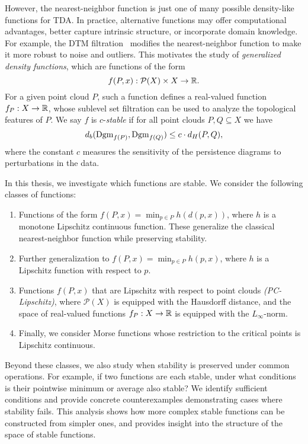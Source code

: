 However, the nearest-neighbor function is just one of many possible density-like
functions for TDA. In practice, alternative functions may offer computational
advantages, better capture intrinsic structure, or incorporate domain knowledge.
For example, the DTM filtration~\cite{anai2020dtm} modifies the nearest-neighbor
function to make it more robust to noise and outliers. This motivates the study
of \emph{generalized density functions}, which are functions of the form
\begin{equation}
    f(P, x) : \mathcal{P}(X) \times X \to \mathbb{R}.
\end{equation}
For a given point cloud $P$, such a function defines a real-valued function
$f_P: X \to \mathbb{R}$, whose sublevel set filtration can be used to analyze the
topological features of $P$. We say $f$ is $c$-\emph{stable} if for all point
clouds $P, Q \subseteq X$ we have
\begin{equation}
    d_b(\operatorname{Dgm}_{f(P)}, \operatorname{Dgm}_{f(Q)}) \leq c \cdot d_H(P, Q),
\end{equation}
where the constant $c$ measures the sensitivity of the persistence diagrams to
perturbations in the data.

In this thesis, we investigate which functions are stable. We consider the
following classes of functions:
\begin{enumerate}
    \item Functions of the form $f(P, x) = \min_{p \in P} h(d(p, x))$, where $h$
          is a monotone Lipschitz continuous function. These generalize the
          classical nearest-neighbor function while preserving stability.
    \item Further generalization to $f(P, x) = \min_{p \in P} h(p, x)$, where
          $h$ is a Lipschitz function with respect to $p$.
    \item Functions $f(P, x)$ that are Lipschitz with respect to point clouds
          \emph{(PC-Lipschitz)}, where $\mathcal{P}(X)$ is equipped with the
          Hausdorff distance, and the space of real-valued functions $f_P : X
          \to \mathbb{R}$ is equipped with the $L_\infty$-norm.
    \item Finally, we consider Morse functions whose restriction to the critical
          points is Lipschitz continuous.
\end{enumerate}

Beyond these classes, we also study when stability is preserved under common
operations. For example, if two functions are each stable, under what conditions
is their pointwise minimum or average also stable? We identify sufficient
conditions and provide concrete counterexamples demonstrating cases where
stability fails. This analysis shows how more complex stable functions can be
constructed from simpler ones, and provides insight into the structure of the
space of stable functions.

